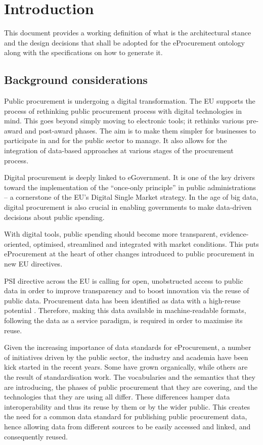 \section{Introduction}
\label{sec:introduction}

 	This document provides a working definition of what is the architectural stance and the design decisions that shall be adopted for the eProcurement ontology along with the specifications on how to generate it. 
	
	\subsection{Background considerations}
	
	Public procurement is undergoing a digital transformation. The EU supports the process of rethinking public procurement process with digital technologies in mind. This goes beyond simply moving to electronic tools; it rethinks various pre-award and post-award phases. The aim is to make them simpler for businesses to participate in and for the public sector to manage. It also allows for the integration of data-based approaches at various stages of the procurement process.
	
	Digital procurement is deeply linked to eGovernment. It is one of the key drivers toward the implementation of the ``once-only principle'' in public administrations -- a cornerstone of the EU's Digital Single Market strategy. In the age of big data, digital procurement is also crucial in enabling governments to make data-driven decisions about public spending.
	
	With digital tools, public spending should become more transparent, evidence-oriented, optimised, streamlined and integrated with market conditions. This puts eProcurement at the heart of other changes introduced to public procurement in new EU directives.
	
	PSI directive \cite{directive-2013/37/EU} across the EU is calling for open, unobstructed access to public data in order to improve transparency and to boost innovation via the reuse of public data. Procurement data has been identified as data with a high-reuse potential \cite{d-high-value-assets}. Therefore, making this data available in machine-readable formats, following the data as a service paradigm, is required in order to maximise its reuse.
	
	Given the increasing importance of data standards for eProcurement, a number of initiatives driven by the public sector, the industry and academia have been kick started	in the recent years. Some have grown organically, while others are the result of	standardisation work. The vocabularies and the semantics that they are introducing, the 
	phases of public procurement that they are covering, and the technologies that they are using all differ. These differences hamper data interoperability and thus its reuse by them or by the wider public. This creates the need for a common data standard for publishing public procurement data, hence allowing data from different sources to be 
	easily accessed and linked, and consequently reused. 
	
